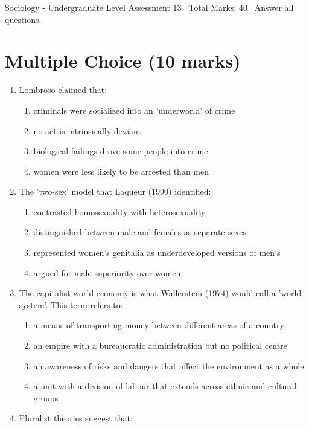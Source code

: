 \documentclass[12pt]{article}
\begin{document}
\begin{center}
Sociology - Undergraduate Level Assessment 13 \
Total Marks: 40 \
Answer all questions.
\end{center}

\section*{Multiple Choice (10 marks)}
\begin{enumerate}[label=\arabic*.]
\item Lombroso claimed that:
\begin{enumerate}[label=(\alph*)]
    \item criminals were socialized into an 'underworld' of crime
    \item no act is intrinsically deviant
    \item biological failings drove some people into crime
    \item women were less likely to be arrested than men
\end{enumerate}
\item The 'two-sex' model that Laqueur (1990) identified:
\begin{enumerate}[label=(\alph*)]
    \item contrasted homosexuality with heterosexuality
    \item distinguished between male and females as separate sexes
    \item represented women's genitalia as underdeveloped versions of men's
    \item argued for male superiority over women
\end{enumerate}
\item The capitalist world economy is what Wallerstein (1974) would call a 'world system'. This term refers to:
\begin{enumerate}[label=(\alph*)]
    \item a means of transporting money between different areas of a country
    \item an empire with a bureaucratic administration but no political centre
    \item an awareness of risks and dangers that affect the environment as a whole
    \item a unit with a division of labour that extends across ethnic and cultural groups
\end{enumerate}
\item Pluralist theories suggest that:
\begin{enumerate}[label=(\alph*)]

\end{enumerate}
\end{enumerate}
\end{document}
